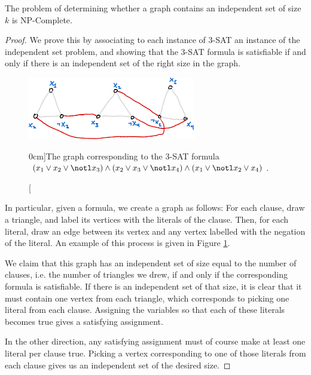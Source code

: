 \documentclass[nobib]{tufte-handout}
\begin{document}
\begin{theorem}
    The problem of determining whether a graph contains an independent set of size $k$ is NP-Complete.

    \begin{proof}
        We prove this by associating to each instance of 3-SAT an instance of the independent set problem, and showing that the 3-SAT formula is satisfiable if and only if there is an independent set of the right size in the graph.

        \begin{figure}
            \centering
            \includegraphics[width=0.65\textwidth]{graphics/L8_vx_covers_hamiltonicity_etc/3sat_triangles.png}
            \caption[][0cm]{The graph corresponding to the 3-SAT formula $\left(x_1 \vee x_2 \vee \notl x_3\right) \wedge \left(x_2 \vee x_3 \vee \notl x_4\right) \wedge \left(x_1 \vee \notl x_2 \vee x_4\right)$.}
            \label{fig:3sat_triangles}
        \end{figure}

        In particular, given a formula, we create a graph as follows: For each clause, draw a triangle, and label its vertices with the literals of the clause. Then, for each literal, draw an edge between its vertex and any vertex labelled with the negation of the literal. An example of this process is given in Figure \ref{fig:3sat_triangles}.

        We claim that this graph has an independent set of size equal to the number of clauses, i.e. the number of triangles we drew, if and only if the corresponding formula is satisfiable. If there is an independent set of that size, it is clear that it must contain one vertex from each triangle, which corresponds to picking one literal from each clause. Assigning the variables so that each of these literals becomes true gives a satisfying assignment.

        In the other direction, any satisfying assignment must of course make at least one literal per clause true. Picking a vertex corresponding to one of those literals from each clause gives us an independent set of the desired size.
    \end{proof}
\end{theorem}
\end{document}
